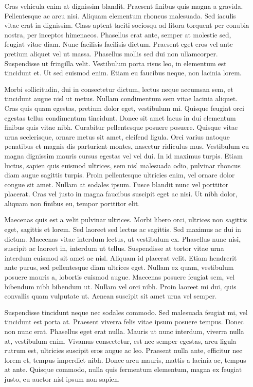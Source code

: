 Cras vehicula enim at dignissim blandit. Praesent finibus quis magna a gravida. Pellentesque ac arcu nisi. Aliquam elementum rhoncus malesuada. Sed iaculis vitae erat in dignissim. Class aptent taciti sociosqu ad litora torquent per conubia nostra, per inceptos himenaeos. Phasellus erat ante, semper at molestie sed, feugiat vitae diam. Nunc facilisis facilisis dictum. Praesent eget eros vel ante pretium aliquet vel ut massa. Phasellus mollis sed dui non ullamcorper. Suspendisse ut fringilla velit. Vestibulum porta risus leo, in elementum est tincidunt et. Ut sed euismod enim. Etiam eu faucibus neque, non lacinia lorem.

Morbi sollicitudin, dui in consectetur dictum, lectus neque accumsan sem, et tincidunt augue nisl ut metus. Nullam condimentum sem vitae lacinia aliquet. Cras quis quam egestas, pretium dolor eget, vestibulum mi. Quisque feugiat orci egestas tellus condimentum tincidunt. Donec sit amet lacus in dui elementum finibus quis vitae nibh. Curabitur pellentesque posuere posuere. Quisque vitae urna scelerisque, ornare metus sit amet, eleifend ligula. Orci varius natoque penatibus et magnis dis parturient montes, nascetur ridiculus mus. Vestibulum eu magna dignissim mauris cursus egestas vel vel dui. In id maximus turpis. Etiam luctus, sapien quis euismod ultrices, sem nisl malesuada odio, pulvinar rhoncus diam augue sagittis turpis. Proin pellentesque ultricies enim, vel ornare dolor congue sit amet. Nullam at sodales ipsum. Fusce blandit nunc vel porttitor placerat. Cras vel justo in magna faucibus suscipit eget ac nisi. Ut nibh dolor, aliquam non finibus eu, tempor porttitor elit.

Maecenas quis est a velit pulvinar ultrices. Morbi libero orci, ultrices non sagittis eget, sagittis et lorem. Sed laoreet sed lectus ac sagittis. Sed maximus ac dui in dictum. Maecenas vitae interdum lectus, ut vestibulum ex. Phasellus nunc nisi, suscipit ac laoreet in, interdum ut tellus. Suspendisse at tortor vitae urna interdum euismod sit amet ac nisl. Aliquam id placerat velit. Etiam hendrerit ante purus, sed pellentesque diam ultrices eget. Nullam ex quam, vestibulum posuere mauris a, lobortis euismod augue. Maecenas posuere feugiat sem, vel bibendum nibh bibendum ut. Nullam vel orci nibh. Proin laoreet mi dui, quis convallis quam vulputate ut. Aenean suscipit sit amet urna vel semper.

Suspendisse tincidunt neque nec sodales commodo. Sed malesuada feugiat mi, vel tincidunt est porta at. Praesent viverra felis vitae ipsum posuere tempus. Donec non nunc erat. Phasellus eget erat nulla. Mauris ut nunc interdum, viverra nulla at, vestibulum enim. Vivamus consectetur, est nec semper egestas, arcu ligula rutrum est, ultricies suscipit eros augue ac leo. Praesent nulla ante, efficitur nec lorem et, tempus imperdiet nibh. Donec arcu mauris, mattis a lacinia ac, tempus at ante. Quisque commodo, nulla quis fermentum elementum, magna ex feugiat justo, eu auctor nisl ipsum non sapien.

